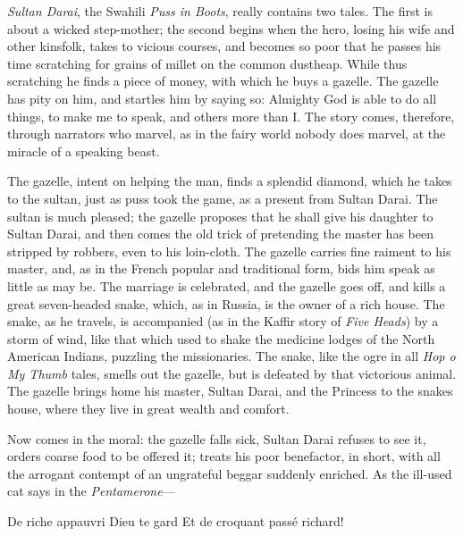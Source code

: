 \documentclass[14pt,a4paper]{memoir}
\begin{document}
{\emph{Sultan Darai}, the Swahili \emph{Puss in Boots}, really contains
two tales. The first is about a wicked step-mother; the second begins
when the hero, losing his wife and other kinsfolk, takes to vicious
courses, and becomes so poor that he passes his time scratching for
grains of millet on the common dustheap. While thus scratching he finds
a piece of money, with which he buys a gazelle. The gazelle has pity on
him, and startles him by saying so: \textquotesingle Almighty God is
able to do all things, to make me to speak, and others more than
I.\textquotesingle{} The story comes, therefore, through narrators who
marvel, as in the fairy world nobody does marvel, at the miracle of a
speaking beast.

The gazelle, intent on helping the man, finds a splendid diamond, which
he takes to the sultan, just as puss took the game, as
\textquotesingle a present from Sultan Darai.\textquotesingle{} The
sultan is much pleased; the gazelle proposes that he shall give his
daughter to Sultan Darai, and then comes the old trick of pretending the
master has been stripped by robbers, \textquotesingle even to his
loin-cloth.\textquotesingle{} The gazelle carries fine raiment to his
master, and, as in the French popular and traditional form, bids him
speak as little as may be. The marriage is celebrated, and the gazelle
goes off, and kills a great seven-headed snake, which, as in Russia, is
the owner of a rich house. The snake, as he travels, is accompanied (as
in the Kaffir story of \emph{Five Heads}) by a storm of wind, like that
which used to shake the \textquotesingle medicine
lodges\textquotesingle{} of the North American Indians, puzzling the
missionaries. The snake, like the ogre in all \emph{Hop
o\textquotesingle{} My Thumb} tales, smells out the gazelle, but is
defeated by that victorious animal. The gazelle brings home his master,
Sultan Darai, and the Princess to the snake\textquotesingle s house,
where they live in great wealth and comfort.

Now comes in the moral: the gazelle falls sick, Sultan Darai refuses to
see it, orders coarse food to be offered it; treats his poor benefactor,
in short, with all the arrogant contempt of an ungrateful beggar
suddenly enriched. As the ill-used cat says in the \emph{Pentamerone}---

\protect\hypertarget{4533318093929944247_33931-h-1.htm.xhtml}{}{}

{De riche appauvri Dieu te gard\textquotesingle{}} {Et de croquant passé
richard!}

}
\end{document}
